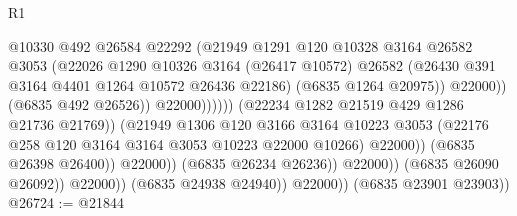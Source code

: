 \begin{lexlean}{R1}
\begin{coremodule}
                                                  @10330
                                                  @492
                                                  @26584
                                                  @22292
                                                  (@21949
                                                    @1291
                                                    @120
                                                    @10328
                                                    @3164
                                                    @26582
                                                    @3053
                                                    (@22026
                                                      @1290
                                                      @10326
                                                      @3164
                                                      (@26417 @10572)
                                                      @26582
                                                      (@26430
                                                        @391
                                                        @3164
                                                        @4401
                                                        @1264
                                                        @10572
                                                        @26436
                                                        @22186)
                                                      (@6835 @1264 @20975))
                                                    @22000))
                                                (@6835 @492 @26526))
                                              @22000))))))
                                  (@22234 @1282 @21519 @429 @1286 @21736 @21769))
                                (@21949
                                  @1306
                                  @120
                                  @3166
                                  @3164
                                  @10223
                                  @3053
                                  (@22176 @258 @120 @3164 @3164 @3053 @10223 @22000 @10266)
                                  @22000))
                              (@6835 @26398 @26400))
                            @22000))
                        (@6835 @26234 @26236))
                      @22000))
                  (@6835 @26090 @26092))
                @22000))
            (@6835 @24938 @24940))
          @22000))
      (@6835 @23901 @23903))
@26724 := @21844

\end{coremodule}
\end{lexlean}
